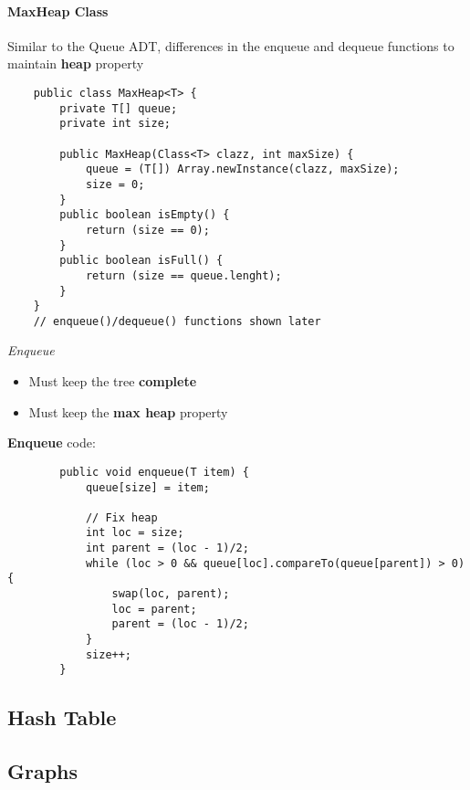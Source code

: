 \documentclass[10pt, 
a4paper, 
oneside, 
headinclude, footinclude, 
BCOR5mm]
{scrartcl}
\begin{document}
\paragraph{\textbf{MaxHeap Class}}
Similar to the Queue ADT, differences in the enqueue and dequeue functions to maintain \textbf{heap} property
\begin{lstlisting}
    public class MaxHeap<T> {
        private T[] queue;
        private int size;

        public MaxHeap(Class<T> clazz, int maxSize) {
            queue = (T[]) Array.newInstance(clazz, maxSize);
            size = 0;
        }
        public boolean isEmpty() {
            return (size == 0);
        }
        public boolean isFull() {
            return (size == queue.lenght);
        }
    }
    // enqueue()/dequeue() functions shown later
\end{lstlisting}
\begin{definition}
    \textit{Enqueue}
    \begin{itemize}
        \item Must keep the tree \textbf{complete}
        \item Must keep the \textbf{max heap} property
    \end{itemize}
    \newpage
    \textbf{Enqueue} code:
    \begin{lstlisting}
        public void enqueue(T item) {
            queue[size] = item;

            // Fix heap
            int loc = size;
            int parent = (loc - 1)/2;
            while (loc > 0 && queue[loc].compareTo(queue[parent]) > 0) {
                swap(loc, parent);
                loc = parent;
                parent = (loc - 1)/2;
            }
            size++;
        }

    \end{lstlisting}
\end{definition}


\newpage

\subsection{Hash Table}

\newpage

\subsection{Graphs}
\end{document}
